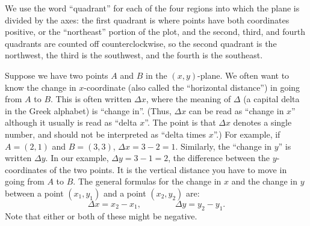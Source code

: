 %
%

We use the word ``quadrant'' for each of the four regions into which
the plane is divided by the axes: the first quadrant is where points
have both coordinates positive, or the ``northeast'' portion of the
plot, and the second, third, and fourth quadrants are counted off
counterclockwise, so the second quadrant is the northwest, the third
is the southwest, and the fourth is the southeast.

Suppose we have two points $A$ and $B$ in the $(x,y)$-plane.
We often want to know the change in $x$-coordinate (also called the
``horizontal distance'') in going from $A$ to $B$.  This is often
written $\Delta x$, where the meaning of $\Delta$ (a capital delta in
the Greek alphabet) is ``change in''. (Thus, $\Delta x$ can be read as
``change in $x$'' although it usually is read as ``delta $x$''. The
point is that $\Delta x$ denotes a single number, and should not be
interpreted as ``delta times $x$''.)  
For example, if $A=(2,1)$ and $B=(3,3)$, $\Delta
x=3-2=1$.  Similarly, the ``change in $y$'' is written $\Delta y$.  In
our example, $\Delta y= 3-1=2$, the difference between the
$y$-coordinates of the two points.  It is the vertical distance you
have to move in going from $A$ to $B$.  The general formulas for the
change in $x$ and the change in $y$ between a point $(x_1,y_1)$ and a
point $(x_2,y_2)$ are:
$$
\Delta x=x_2-x_1,\qquad\qquad\Delta y=y_2-y_1.
$$
Note that either or both of these might be negative.





